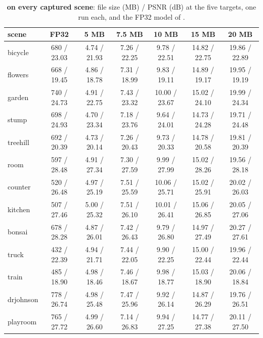 \begin{table}[t]\centering\footnotesize
\caption{\textbf{\BM on every captured scene}: file size (MB) / PSNR (dB) at the five targets, one run each, and the FP32 model of \MS.}
\label{sup:tab:perscene}
\begin{tabular}{@{}lcccccc@{}}
\toprule
scene & FP32 & 5 MB & 7.5 MB & 10 MB & 15 MB & 20 MB \\
\midrule
bicycle & 680 / 23.03 & 4.74 / 21.93 & 7.26 / 22.25 & 9.78 / 22.51 & 14.82 / 22.75 & 19.86 / 22.89 \\
flowers & 668 / 19.45 & 4.86 / 18.78 & 7.31 / 18.99 & 9.83 / 19.11 & 14.89 / 19.17 & 19.95 / 19.19 \\
garden & 740 / 24.73 & 4.91 / 22.75 & 7.43 / 23.32 & 10.00 / 23.67 & 15.02 / 24.10 & 19.99 / 24.34 \\
stump & 698 / 24.93 & 4.70 / 23.34 & 7.18 / 23.76 & 9.64 / 24.01 & 14.73 / 24.28 & 19.71 / 24.48 \\
treehill & 692 / 20.39 & 4.73 / 20.14 & 7.26 / 20.43 & 9.73 / 20.33 & 14.78 / 20.58 & 19.81 / 20.39 \\
room & 597 / 28.48 & 4.91 / 27.34 & 7.30 / 27.59 & 9.99 / 27.99 & 15.02 / 28.26 & 19.56 / 28.18 \\
counter & 520 / 26.48 & 4.97 / 25.19 & 7.51 / 25.59 & 10.06 / 25.71 & 15.02 / 25.91 & 20.02 / 26.03 \\
kitchen & 507 / 27.46 & 5.00 / 25.32 & 7.51 / 26.10 & 10.01 / 26.41 & 15.06 / 26.85 & 20.05 / 27.06 \\
bonsai & 678 / 28.28 & 4.87 / 26.01 & 7.42 / 26.43 & 9.79 / 26.80 & 14.97 / 27.49 & 20.27 / 27.61 \\
\midrule
truck & 432 / 22.39 & 4.94 / 21.71 & 7.44 / 22.05 & 9.90 / 22.25 & 15.00 / 22.44 & 19.96 / 22.44 \\
train & 485 / 18.90 & 4.98 / 18.46 & 7.46 / 18.67 & 9.98 / 18.77 & 15.03 / 18.90 & 20.06 / 18.84 \\
\midrule
drjohnson & 778 / 26.74 & 4.98 / 25.48 & 7.47 / 25.96 & 9.92 / 26.14 & 14.87 / 26.29 & 19.76 / 26.51 \\
playroom & 765 / 27.72 & 4.99 / 26.60 & 7.14 / 26.83 & 9.94 / 27.25 & 14.77 / 27.38 & 20.11 / 27.50 \\
\bottomrule
\end{tabular}
\end{table}

